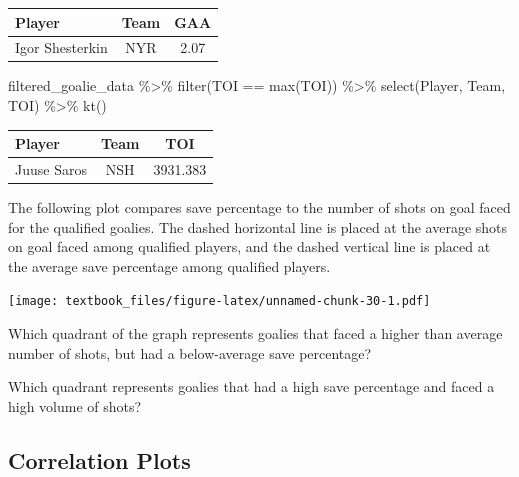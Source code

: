 \documentclass[
  11pt,
]{book}
\newenvironment{Shaded}{\begin{snugshade}}{\end{snugshade}}
\newcommand{\FunctionTok}[1]{\textcolor[rgb]{0.00,0.00,0.00}{#1}}
\newcommand{\NormalTok}[1]{#1}
\newcommand{\SpecialCharTok}[1]{\textcolor[rgb]{0.00,0.00,0.00}{#1}}
\theoremstyle{definition}
\theoremstyle{definition}
\theoremstyle{definition}
\theoremstyle{definition}
\theoremstyle{remark}
\begin{document}
\begin{table}[H]
\centering
\begin{tabular}{l|c|c}
\hline
Player & Team & GAA\\
\hline
Igor Shesterkin & NYR & 2.07\\
\hline
\end{tabular}
\end{table}

\begin{Shaded}
\begin{Highlighting}[]
\NormalTok{filtered\_goalie\_data }\SpecialCharTok{\%\textgreater{}\%} \FunctionTok{filter}\NormalTok{(TOI }\SpecialCharTok{==} \FunctionTok{max}\NormalTok{(TOI)) }\SpecialCharTok{\%\textgreater{}\%} \FunctionTok{select}\NormalTok{(Player, Team, TOI) }\SpecialCharTok{\%\textgreater{}\%} \FunctionTok{kt}\NormalTok{()}
\end{Highlighting}
\end{Shaded}

\begin{table}[H]
\centering
\begin{tabular}{l|c|c}
\hline
Player & Team & TOI\\
\hline
Juuse Saros & NSH & 3931.383\\
\hline
\end{tabular}
\end{table}

The following plot compares save percentage to the number of shots on goal faced for the qualified goalies. The dashed horizontal line is placed at the average shots on goal faced among qualified players, and the dashed vertical line is placed at the average save percentage among qualified players.

\texttt{[image: textbook\_files/figure-latex/unnamed-chunk-30-1.pdf]}

Which quadrant of the graph represents goalies that faced a higher than average number of shots, but had a below-average save percentage?

\hfill\break
\hfill\break
\hfill\break

Which quadrant represents goalies that had a high save percentage and faced a high volume of shots?

\hfill\break
\hfill\break
\hfill\break

\hypertarget{correlation-plots}{%
\subsection{Correlation Plots}\label{correlation-plots}}
\end{document}
